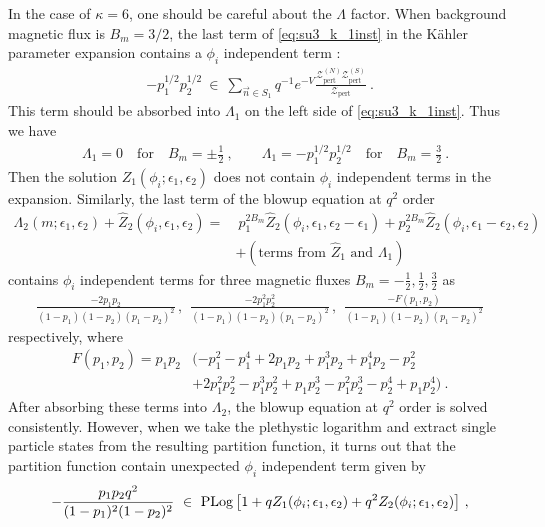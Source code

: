 In the case of $ \kappa = 6 $, one should be careful about the $ \Lambda $ factor. When background magnetic flux is $ B_m = 3/2 $, the last term of \eqref{eq:su3_k_1inst} in the K\"ahler parameter expansion  contains a $ \phi_i $ independent term :
\begin{align}
-p_1^{1/2} p_2^{1/2}\ \in\ \sum_{\vec{n} \in S_1} q^{-1} e^{-V} \frac{\mathcal{Z}_{\mathrm{pert}}^{(N)} \mathcal{Z}_{\mathrm{pert}}^{(S)}}{\mathcal{Z}_{\mathrm{pert}}} \ .
\end{align}
This term should be absorbed into $ \Lambda_1 $ on the left side of \eqref{eq:su3_k_1inst}. Thus we have
\begin{align}
&\Lambda_1 = 0 \quad \text{for} \quad B_m = \pm \tfrac{1}{2} \ , \qquad \Lambda_1 = -p_1^{1/2} p_2^{1/2} \quad \text{for} \quad B_m = \tfrac{3}{2} \ .
\end{align}
Then the solution $ Z_1(\phi_i; \epsilon_1, \epsilon_2) $ does not contain $ \phi_i $ independent terms in the expansion. Similarly, the last term of the blowup equation at $ q^2 $ order
\begin{align}\label{eq:su3_6_2inst_blowup}
\Lambda_2(m; \epsilon_1, \epsilon_2) + \hat{Z}_2(\phi_i, \epsilon_1, \epsilon_2)
=&~ p_1^{2B_m} \hat{Z}_2(\phi_i, \epsilon_1, \epsilon_2 - \epsilon_1) + p_2^{2B_m}\hat{Z}_2(\phi_i, \epsilon_1 - \epsilon_2, \epsilon_2) \nonumber \\
& + (\text{terms from } \hat{Z}_{1} \text{ and } \Lambda_1)
\end{align}
contains $ \phi_i $ independent terms for three magnetic fluxes $ B_m = -\tfrac12, \tfrac12, \tfrac32 $ as
\begin{align}
	\frac{-2 p_1 p_2}{(1-p_1) (1-p_2) (p_1-p_2)^2} \, , \ \ \frac{-2p_1^2 p_2^2}{(1-p_1)(1-p_2)(p_1-p_2)^2}  \, , \ \ \frac{-F(p_1, p_2)}{(1-p_1)(1-p_2)(p_1 - p_2)^2}
\end{align}
respectively, where
\begin{align}
F(p_1, p_2) = p_1 p_2 &(-p_1^2 -p_1^4 + 2 p_1 p_2 + p_1^3 p_2 + p_1^4 p_2 - p_2^2 \nonumber \\
& + 2 p_1^2 p_2^2 - p_1^3 p_2^2 + p_1 p_2^3 - p_1^2 p_2^3 - p_2^4 + p_1 p_2^4) \ .
\end{align}
After absorbing these terms into $ \Lambda_2 $, the blowup equation at $q^2$ order is solved consistently. However, when we take the plethystic logarithm and extract single particle states from the resulting partition function, it turns out that the partition function contain unexpected $ \phi_i $ independent term given by
\begin{align}
-\frac{p_1 p_2 q^2}{(1-p_1)^2 (1-p_2)^2}\ \in\ \operatorname{PLog}\qty[1 + q Z_1(\phi_i; \epsilon_1, \epsilon_2) + q^2 Z_2(\phi_i; \epsilon_1, \epsilon_2)] \ ,
\end{align}
